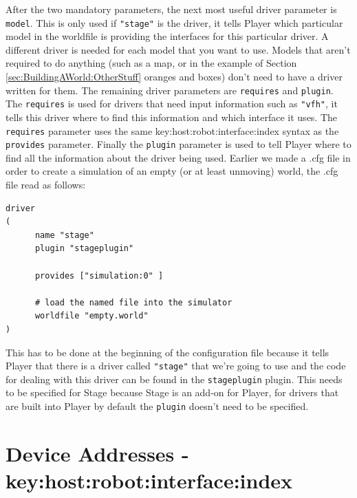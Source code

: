 \documentclass[a4paper]{report}
\newcommand{\pl}{Player\xspace}
\begin{document}
After the two mandatory parameters, the next most useful driver parameter is \verb|model|. This is only used if \verb|"stage"| is the driver, it tells \pl which particular model in the worldfile is providing the interfaces for this particular driver. A different driver is needed for each model that you want to use. 
Models that aren't required to do anything (such as a map, or in the example of Section \ref{sec:BuildingAWorld:OtherStuff} oranges and boxes) don't need to have a driver written for them.\newline
The remaining driver parameters are \verb|requires| and \verb|plugin|. The \verb|requires| is used for drivers that need input information such as \verb|"vfh"|, it tells this driver where to find this information and which interface it uses. 
The \verb|requires| parameter uses the same key:host:robot:interface:index syntax as the \verb|provides| parameter. Finally the \verb|plugin| parameter is used to tell \pl where to find all the information about the driver being used. 
Earlier we made a .cfg file in order to create a simulation of an empty (or at least unmoving) world, the .cfg file read as follows:
\begin{verbatim}
driver
(		
      name "stage"
      plugin "stageplugin"

      provides ["simulation:0" ]

      # load the named file into the simulator
      worldfile "empty.world"	
)
\end{verbatim}
This has to be done at the beginning of the configuration file because it tells \pl that there is a driver called \verb|"stage"| that we're going to use and the code for dealing with this driver can be found in the \verb|stageplugin| plugin. This needs to be specified for Stage because Stage is an add-on for \pl, for drivers that are built into \pl by default the \verb|plugin| doesn't need to be specified.

\section{Device Addresses - key:host:robot:interface:index} \label{sec:ConfigurationFile:DeviceAddress}
\end{document}
